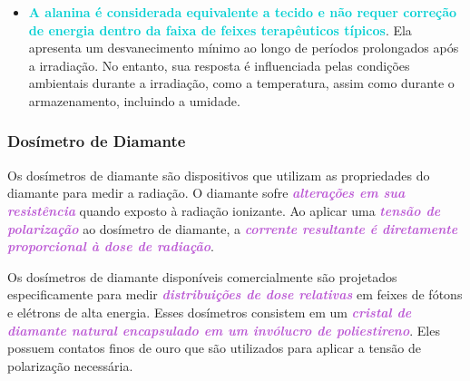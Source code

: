 \documentclass[11pt,a4paper]{article}
\newcounter{exemplo}
\begin{document}
	\begin{exemplo}
		\begin{itemize}
			\item \textcolor{DarkTurquoise}{\textbf{A alanina é considerada equivalente a tecido e não requer correção de energia dentro da faixa de feixes terapêuticos típicos}}. Ela apresenta um desvanecimento mínimo ao longo de períodos prolongados após a irradiação. No entanto, sua resposta é influenciada pelas condições ambientais durante a irradiação, como a temperatura, assim como durante o armazenamento, incluindo a umidade.
		\end{itemize}
	\end{exemplo}
	

\subsubsection*{Dosímetro de Diamante}

	Os dosímetros de diamante são dispositivos que utilizam as propriedades do diamante para medir a radiação. O diamante sofre \textcolor{MediumOrchid}{\textit{\textbf{alterações em sua resistência}}} quando exposto à radiação ionizante. Ao aplicar uma \textcolor{MediumOrchid}{\textit{\textbf{tensão de polarização}}} ao dosímetro de diamante, a \textcolor{MediumOrchid}{\textit{\textbf{corrente resultante é diretamente proporcional à dose de radiação}}}.

	Os dosímetros de diamante disponíveis comercialmente são projetados especificamente para medir \textcolor{MediumOrchid}{\textit{\textbf{distribuições de dose relativas}}} em feixes de fótons e elétrons de alta energia. Esses dosímetros consistem em um \textcolor{MediumOrchid}{\textit{\textbf{cristal de diamante natural encapsulado em um invólucro de poliestireno}}}. Eles possuem contatos finos de ouro que são utilizados para aplicar a tensão de polarização necessária.
\end{document}
